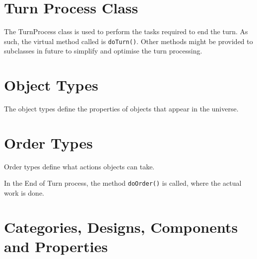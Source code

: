 \documentclass[a4paper,11pt]{report}
\begin{document}
\section{Turn Process Class}
\label{sec:turn-process}

The TurnProcess class is used to perform the tasks required to end the turn. As such, the virtual method called is \texttt{doTurn()}.  Other methods might be provided to subclasses in future to simplify and optimise the turn processing.

\section{Object Types}
\label{sec:object-types}

The object types define the properties of objects that appear in the universe.

\section{Order Types}
\label{sec:order-types}

Order types define what actions objects can take.

In the End of Turn process, the method \texttt{doOrder()} is called, where the actual work is done.

\section{Categories, Designs, Components and Properties}
\label{sec:designs-components-properties}
\end{document}
